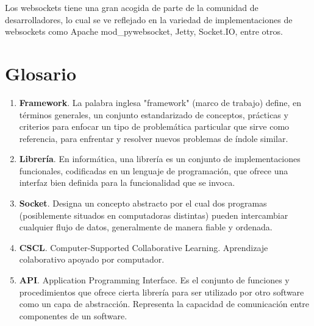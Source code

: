 Los websockets tiene una gran acogida de parte de la comunidad de desarrolladores, lo cual se ve reflejado en la variedad de implementaciones de websockets como Apache mod\_pywebsocket, Jetty, Socket.IO, entre otros.


\section{Glosario}

\begin{enumerate}
  \item \textbf{Framework}. La palabra inglesa "framework" (marco de trabajo) define, en términos generales, un conjunto estandarizado de conceptos, prácticas y criterios para enfocar un tipo de problemática particular que sirve como referencia, para enfrentar y resolver nuevos problemas de índole similar.
  \item \textbf{Librería}. En informática, una librería es un conjunto de implementaciones funcionales, codificadas en un lenguaje de programación, que ofrece una interfaz bien definida para la funcionalidad que se invoca.
  \item \textbf{Socket}. Designa un concepto abstracto por el cual dos programas (posiblemente situados en computadoras distintas) pueden intercambiar cualquier flujo de datos, generalmente de manera fiable y ordenada.
  \item \textbf{CSCL}. Computer-Supported Collaborative Learning. Aprendizaje colaborativo apoyado por computador.
  \item \textbf{API}. Application Programming Interface. Es el conjunto de funciones y procedimientos que ofrece cierta librería para ser utilizado por otro software como un capa de abstracción. Representa la capacidad de comunicación entre componentes de un software.
\end{enumerate}













